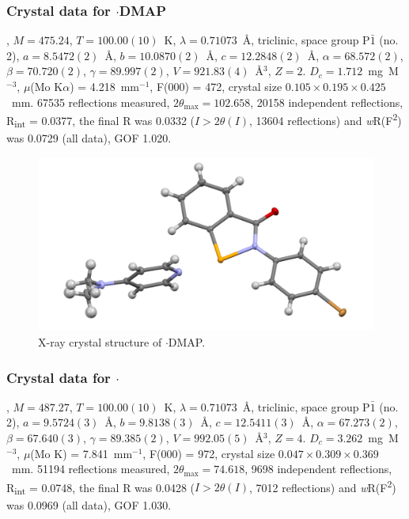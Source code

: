 \begin{refsection}
\subsubsection{Crystal data for \texorpdfstring{$\cdot$DMAP}{C20 H18 Br N3 O Se}}
, $M=475.24$, $T=100.00(10)$~K, $\lambda=0.71073$~\AA, triclinic, space group P$\bar{1}$ (no. 2), $a = 8.5472(2)$~\AA, $b = 10.0870(2)$~\AA, $c = 12.2848(2)$~\AA, $\alpha = 68.572(2)$\degree, $\beta = 70.720(2)$\degree, $\gamma = 89.997(2)$\degree, $V = 921.83(4)$~\AA$^{3}$, $Z = 2$. $D_{c}= 1.712$~mg~M$^{-3}$, $\mu$(Mo K$\alpha$) = 4.218~mm$^{-1}$, F(000) = 472, crystal size $0.105 \times 0.195 \times 0.425$~mm. 67535 reflections measured, $2\theta_{\mathrm{max}}=102.658$\degree, 20158 independent reflections, R\textsubscript{int} = 0.0377, the final R was 0.0332 ($I > 2\theta(I)$, 13604 reflections) and \emph{w}R(F\textsuperscript{2}) was 0.0729 (all data), GOF 1.020.

\begin{figure}
  \includegraphics[width=0.6\linewidth]{Figures/ebs-4br-dmap-xtal.pdf}
  \caption{X-ray crystal structure of \texorpdfstring{$\cdot$DMAP}{C20 H18 Br N3 O Se}.}
\end{figure}

\subsubsection{Crystal data for \texorpdfstring{$\cdot$}{C22 H20 Br N2 O Se}}
, $M=487.27$, $T=100.00(10)$~K, $\lambda=0.71073$~\AA, triclinic, space group P$\bar{1}$ (no. 2), $a = 9.5724(3)$~\AA, $b = 9.8138(3)$~\AA, $c = 12.5411(3)$~\AA, $\alpha = 67.273(2)$\degree, $\beta = 67.640(3)$\degree, $\gamma = 89.385(2)$\degree, $V = 992.05(5)$~\AA$^{3}$, $Z = 4$. $D_{c}= 3.262$~mg~M$^{-3}$, $\mu$(Mo K\a) = 7.841~mm$^{-1}$, F(000) = 972, crystal size $0.047 \times 0.309 \times 0.369$~mm. 51194 reflections measured, $2\theta_{\mathrm{max}}=74.618$\degree, 9698 independent reflections, R\textsubscript{int} = 0.0748, the final R was 0.0428 ($I > 2\theta(I)$, 7012 reflections) and \emph{w}R(F\textsuperscript{2}) was 0.0969 (all data), GOF 1.030.


\end{refsection}
